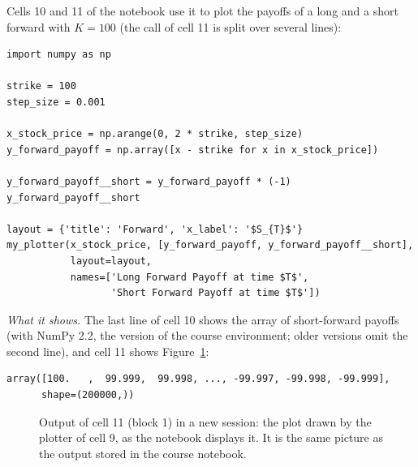 \documentclass[11pt,a4paper]{article}
\newcommand{\src}[2]{\texttt{#1}, lines #2}
\begin{document}
Cells 10 and 11 of the notebook use it to plot the payoffs of a long and a short forward with $K=100$ (the call of cell 11 is split over several lines):
\par\smallskip\noindent\begin{minipage}{\linewidth}\begin{lstlisting}[style=py,title={\src{hw21\_examples.py}{12--27} (block 1)}]
import numpy as np

strike = 100
step_size = 0.001

x_stock_price = np.arange(0, 2 * strike, step_size)
y_forward_payoff = np.array([x - strike for x in x_stock_price])

y_forward_payoff__short = y_forward_payoff * (-1)
y_forward_payoff__short

layout = {'title': 'Forward', 'x_label': '$S_{T}$'}
my_plotter(x_stock_price, [y_forward_payoff, y_forward_payoff__short],
           layout=layout,
           names=['Long Forward Payoff at time $T$',
                  'Short Forward Payoff at time $T$'])
\end{lstlisting}\end{minipage}\par\smallskip
\emph{What it shows.} The last line of cell 10 shows the array of short-forward payoffs (with NumPy 2.2, the version of the course environment; older versions omit the second line), and cell 11 shows Figure~\ref{fig:cell9out}:
\par\smallskip\noindent\begin{minipage}{\linewidth}\begin{lstlisting}[style=out,title={output of cell 10}]
array([100.   ,  99.999,  99.998, ..., -99.997, -99.998, -99.999],
      shape=(200000,))
\end{lstlisting}\end{minipage}\par\smallskip
\begin{figure}[!ht]
\centering
{}
\caption{Output of cell 11 (block 1) in a new session: the plot drawn by the plotter of cell 9, as the notebook displays it. It is the same picture as the output stored in the course notebook.}
\label{fig:cell9out}
\end{figure}
\end{document}
